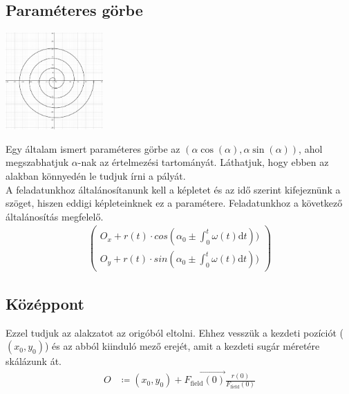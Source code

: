 \documentclass[a4paper]{article}
\newcommand{\dd}[1]{\mathrm{d}#1}
\begin{document}
\begin{multicols}{2}
\section{Paraméteres görbe}
	\begin{center}
		\includegraphics[height=10em]{graphics/parametric base.png}
	\end{center}
	Egy általam ismert paraméteres görbe az $(\alpha\cos(\alpha), \alpha\sin(\alpha))$, ahol megszabhatjuk $\alpha$-nak az értelmezési tartományát. Láthatjuk, hogy ebben az alakban könnyedén le tudjuk írni a pályát. \\
	A feladatunkhoz általánosítanunk kell a képletet és az idő szerint kifejeznünk a szöget, hiszen eddigi képleteinknek ez a paramétere. Feladatunkhoz a következő általánosítás megfelelő.
	\begin{align*}
		\begin{pmatrix}
			O_{x} + r(t) \cdot cos(\alpha_{0} \pm \int_{0}^{t} \omega(t) \dd{t})) \\
			O_{y} + r(t) \cdot sin(\alpha_{0} \pm \int_{0}^{t} \omega(t) \dd{t}))
		\end{pmatrix}
	\end{align*}
	
	\subsection{Középpont}
		Ezzel tudjuk az alakzatot az origóból eltolni. Ehhez vesszük a kezdeti pozíciót ($(x_0, y_0)$) és az abból kiinduló mező erejét, amit a kezdeti sugár méretére skálázunk át.
		\begin{align*}
			O &\coloneqq (x_{0}, y_{0}) + \vec{F_{\mathrm{field}}(0)} \frac{r(0)}{F_{\mathrm{field}}(0)}
		\end{align*}


\end{multicols}
\end{document}
